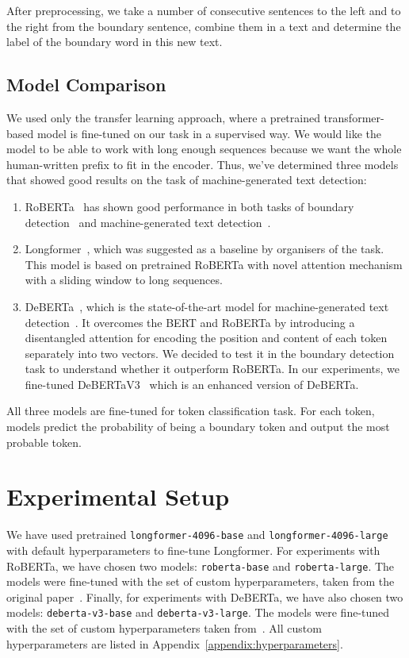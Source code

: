 \documentclass[11pt]{article}
\begin{document}
    After preprocessing, we take a number of consecutive sentences to the left and to the right from the boundary sentence, combine them in a text and determine the label of the boundary word in this new text.
    
\subsection{Model Comparison}
\label{sec:model_comparison}
We used only the transfer learning approach, where a pretrained transformer-based model is fine-tuned on our task in a supervised way. We would like the model to be able to work with long enough sequences because we want the whole human-written prefix to fit in the encoder. Thus, we've determined three models that showed good results on the task of machine-generated text detection:
    
    \begin{enumerate}
        \item RoBERTa~\cite{roberta} has shown good performance in both tasks of boundary  detection~\cite{kushnareva2023artificial} and  machine-generated text detection~\cite{macko-etal-2023-multitude}.
        \item Longformer~\cite{longformer}, which was suggested as a baseline by organisers of the task. This model is based on pretrained RoBERTa with novel attention mechanism with a sliding window to long sequences.
        \item DeBERTa~\cite{he2021deberta}, which is the state-of-the-art model for machine-generated text detection~\cite{macko-etal-2023-multitude}. It overcomes the BERT and RoBERTa  by introducing a disentangled attention for encoding the position and content of each token separately into two vectors. We decided to test it in the boundary detection task to understand whether it outperform RoBERTa. In our experiments, we fine-tuned DeBERTaV3~\cite{he2021debertav3} which is an enhanced version of DeBERTa.
\end{enumerate}

All three models are fine-tuned for token classification task. For each token, models predict the probability of being a boundary token and output the most probable token.


\section{Experimental Setup} 
       We have used pretrained \texttt{longformer-4096-base} and \texttt{longformer-4096-large} with default hyperparameters to fine-tune Longformer. 
        For experiments with RoBERTa, we have chosen two models: \texttt{roberta-base} and  \texttt{roberta-large}. The models were fine-tuned with the set of custom hyperparameters, taken from the original paper~\cite{roberta}. 
        Finally, for experiments with DeBERTa, we have also chosen two models:  \texttt{deberta-v3-base} and  \texttt{deberta-v3-large}. The models were fine-tuned with the set of custom hyperparameters taken from~\citet{he2021debertav3}. All custom hyperparameters are listed in Appendix~\ref{appendix:hyperparameters}.
        
\end{document}
